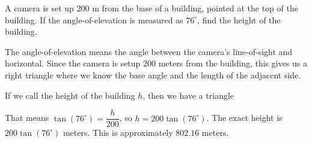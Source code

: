 \documentclass[nooutcomes]{ximera}
\begin{document}
\begin{example}
	
	A camera is set up 200 m from the base of a building, pointed at the top of the building. If the angle-of-elevation is measured as $76^\circ$, find the height of the building.
	
	\begin{explanation}
		
		The angle-of-elevation means the angle between the camera's line-of-sight and horizontal. Since the camera is setup 200 meters from the building, this gives us a right triangle where we know the
		base angle and the length of the adjacent side.
		
		If we call the height of the building $h$, then we have a triangle
		\begin{image}[2in]
		\end{image}
		
		That means $\tan(76^\circ) = \dfrac{h}{200}$, so $h = 200 \tan(76^\circ)$. The exact height is $200 \tan(76^\circ)$ meters. This is approximately $802.16$ meters.

	\end{explanation}
\end{example}
\end{document}
